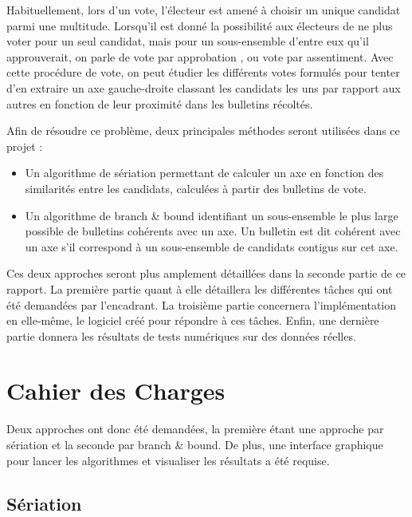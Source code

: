 \documentclass[11pt, a4paper]{article}
\begin{document}
Habituellement, lors d'un vote, l'\'{e}lecteur est amen\'{e} \`{a} choisir un unique candidat parmi une multitude. Lorsqu'il est donn\'{e} la possibilit\'{e} aux \'{e}lecteurs de ne plus voter pour un seul candidat, mais pour un sous-ensemble d'entre eux qu'il approuverait, on parle de vote par \og approbation \fg{}, ou vote par \og assentiment\fg{}. Avec cette proc\'{e}dure de vote, on peut \'{e}tudier les diff\'{e}rents votes formul\'{e}s pour tenter d'en extraire un axe \og gauche-droite \fg{} classant les candidats les uns par rapport aux autres en fonction de leur proximit\'{e} dans les bulletins r\'{e}colt\'{e}s.

Afin de r\'{e}soudre ce probl\`{e}me, deux principales m\'{e}thodes seront utilis\'{e}es dans ce projet :
\begin{itemize}
\item Un algorithme de s\'{e}riation permettant de calculer un axe en fonction des similarit\'{e}s entre les candidats, calculées à partir des bulletins de vote.
\item Un algorithme de branch \& bound identifiant un sous-ensemble le plus large possible de bulletins coh\'{e}rents avec un axe. Un bulletin est dit cohérent avec un axe s'il correspond à un sous-ensemble de candidats contigus sur cet axe.\\
\end{itemize}

Ces deux approches seront plus amplement d\'{e}taill\'{e}es dans la seconde partie de ce rapport. La premi\`{e}re partie quant \`{a} elle d\'{e}taillera les diff\'{e}rentes t\^{a}ches qui ont \'{e}t\'{e} demand\'{e}es par l'encadrant. La troisi\`{e}me partie concernera l'impl\'{e}mentation en elle-m\^{e}me, le logiciel cr\'{e}\'{e} pour r\'{e}pondre \`{a} ces t\^{a}ches. Enfin, une derni\`{e}re partie donnera les r\'{e}sultats de tests numériques sur des donn\'{e}es r\'{e}elles.

\section{Cahier des Charges}

Deux approches ont donc \'{e}t\'{e} demand\'{e}es, la premi\`{e}re \'{e}tant une approche par s\'{e}riation et la seconde par branch \& bound. De plus, une interface graphique pour lancer les algorithmes et visualiser les r\'{e}sultats a \'{e}t\'{e} requise.

\subsection{S\'{e}riation}
\label{cdc_seriation}
\end{document}
